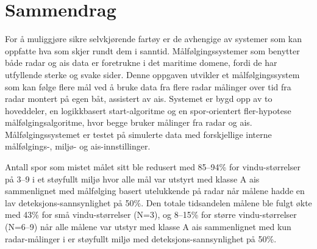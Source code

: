
\section*{\Huge Sammendrag}
\hfill
\noindent

For å muliggjøre sikre selvkjørende fartøy er de avhengige av systemer som kan oppfatte hva som skjer rundt dem i sanntid. Målfølgingssystemer som benytter både radar og \gls{ais} data er foretrukne i det maritime domene, fordi de har utfyllende sterke og svake sider. Denne oppgaven utvikler et målfølgingssystem som kan følge flere mål ved å bruke data fra flere radar målinger over tid fra radar montert på egen båt, assistert av \gls{ais}. Systemet er bygd opp av to hoveddeler, en logikkbasert start-algoritme og en spor-orientert fler-hypotese målfølgingsalgoritme, hvor begge bruker målinger fra radar og \gls{ais}. Målfølgingssystemet er testet på simulerte data med forskjellige interne målfølgings-, miljø- og \gls{ais}-innstillinger. 

Antall spor som mistet målet sitt ble redusert med 85--94\% for vindu-størrelser på 3--9 i et støyfullt miljø hvor alle mål var utstyrt med klasse A \gls{ais} sammenlignet med målfølging basert utelukkende på radar når målene hadde en lav deteksjons-sannsynlighet på 50\%. Den totale tidsandelen målene ble fulgt økte med 43\% for små vindu-størrelser (N=3), og 8--15\% for større vindu-størrelser (N=6--9) når alle målene var utstyr med klasse A \gls{ais} sammenlignet med kun radar-målinger i er støyfullt miljø med deteksjons-sannsynlighet på 50\%.